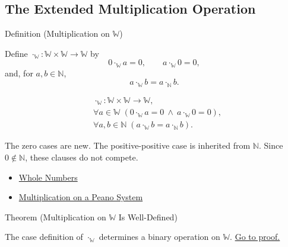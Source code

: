 \subsection*{The Extended Multiplication Operation}

\begin{definitionbox}{Definition (Multiplication on \texorpdfstring{$\mathbb{W}$}{W})}
\begin{definition}
\label{def:multiplication-on-w}
Define $\cdot_{\mathbb{W}}:\mathbb{W}\times\mathbb{W}\to\mathbb{W}$ by
\[
0\cdot_{\mathbb{W}}a=0,\qquad
a\cdot_{\mathbb{W}}0=0,
\]
and, for $a,b\in\mathbb{N}$,
\[
a\cdot_{\mathbb{W}}b=a\cdot_{\mathbb{N}}b.
\]
\end{definition}
\end{definitionbox}

\begin{remark*}
\[
\begin{aligned}
&\cdot_{\mathbb{W}}:\mathbb{W}\times\mathbb{W}\to\mathbb{W},\\
&\forall a\in\mathbb{W}\;(0\cdot_{\mathbb{W}}a=0\ \wedge\ a\cdot_{\mathbb{W}}0=0),\\
&\forall a,b\in\mathbb{N}\;
  (a\cdot_{\mathbb{W}}b=a\cdot_{\mathbb{N}}b).
\end{aligned}
\]
\end{remark*}

\begin{remark*}[Interpretation]
The zero cases are new. The positive-positive case is inherited from
$\mathbb{N}$. Since $0\notin\mathbb{N}$, these clauses do not compete.
\end{remark*}

\begin{dependencies}
\begin{itemize}
  \item \hyperref[def:whole-numbers]{Whole Numbers}
  \item \hyperref[def:multiplication-on-peano-system]{Multiplication on a Peano System}
\end{itemize}
\end{dependencies}

\begin{theorembox}{Theorem (Multiplication on \texorpdfstring{$\mathbb{W}$}{W} Is Well-Defined)}
\begin{theorem}
\label{thm:multiplication-on-w-well-defined}
The case definition of $\cdot_{\mathbb{W}}$ determines a binary operation on
$\mathbb{W}$.
\hyperref[prf:multiplication-on-w-well-defined]{Go to proof.}
\end{theorem}
\end{theorembox}

